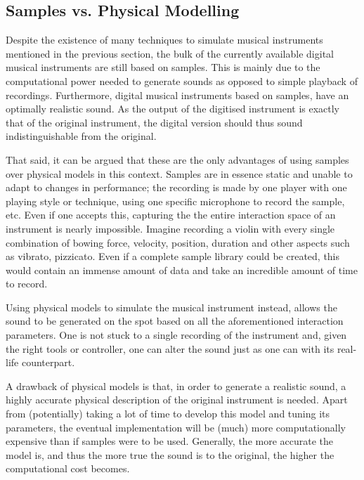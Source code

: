 \subsection{Samples vs. Physical Modelling}
Despite the existence of many techniques to simulate musical instruments mentioned in the previous section, the bulk of the currently available digital musical instruments are still based on samples. This is mainly due to the computational power needed to generate sounds as opposed to simple playback of recordings. Furthermore, digital musical instruments based on samples, have an optimally realistic sound. As the output of the digitised instrument is exactly that of the original instrument, the digital version should thus sound indistinguishable from the original.

That said, it can be argued that these are the only advantages of using samples over physical models in this context. Samples are in essence static and unable to adapt to changes in performance; the recording is made by one player with one playing style or technique, using one specific microphone to record the sample, etc. Even if one accepts this, capturing the the entire interaction space of an instrument is nearly impossible. Imagine recording a violin with every single combination of bowing force, velocity, position, duration and other aspects such as vibrato, pizzicato. Even if a complete sample library could be created, this would contain an immense amount of data and take an incredible amount of time to record. 

Using physical models to simulate the musical instrument instead, allows the sound to be generated on the spot based on all the aforementioned interaction parameters. One is not stuck to a single recording of the instrument and, given the right tools or controller, one can alter the sound just as one can with its real-life counterpart.

A drawback of physical models is that, in order to generate a realistic sound, a highly accurate physical description of the original instrument is needed. Apart from (potentially) taking a lot of time to develop this model and tuning its parameters, the eventual implementation will be (much) more computationally expensive than if samples were to be used. Generally, the more accurate the model is, and thus the more true the sound is to the original, the higher the computational cost becomes. 

